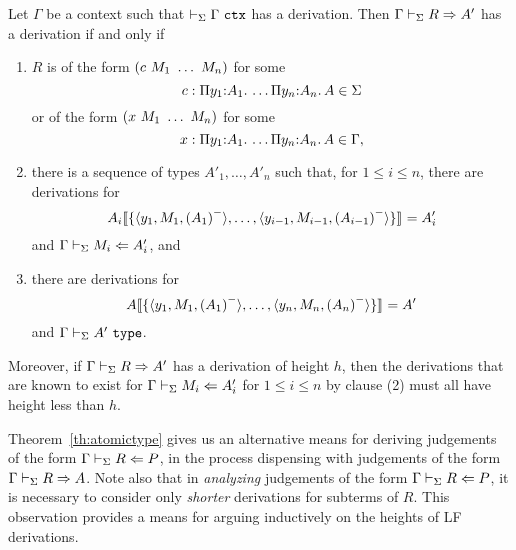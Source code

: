\begin{theorem}\label{th:atomictype}
Let $\Gamma$ be a context such that $\lfctx{\Gamma}$ has a derivation.
%
Then $\lfsynthtype{\Gamma}{R}{A'}$  has a derivation if and only if

\begin{enumerate}
\item $R$ is of the form $(c \app M_1 \app \ldots\app M_n)$ for some
    \[c:\typedpi{y_1}{A_1}{\ldots \typedpi{y_n}{A_n}{A}} \in \Sigma\] or
    of the form $(x \app M_1 \app \ldots\app M_n)$ for some
    \[x:\typedpi{y_1}{A_1}{\ldots \typedpi{y_n}{A_n}{A}} \in \Gamma,\]
    
  \item there is a sequence of types $A'_1,\ldots,A'_n$ such that, for
    $1\leq i\leq n$, there are derivations for
    \[\hsub{\{\langle y_1, M_1,\erase{A_1}\rangle, \ldots,
             \langle y_{i-1}, M_{i-1}, \erase{A_{i-1}} \rangle\}}
          {A_i}
          {A'_i}\]
    and $\lfchecktype{\Gamma}{M_i}{A'_i}$, and
         
  \item there are derivations for
    \[\hsub{\{\langle y_1, M_1,\erase{A_1}\rangle, \ldots,
                 \langle y_n, M_n, \erase{A_n} \rangle\}}
              {A}
              {A'}\]
    and $\lftype{\Gamma}{A'}$.
  \end{enumerate}
  Moreover, if $\lfsynthtype{\Gamma}{R}{A'}$ has a derivation of
  height $h$, then the derivations that are known to exist for
  $\lfchecktype{\Gamma}{M_i}{A'_i}$  for $1 \leq i \leq n$ by clause
  (2) must all have height less than $h$.
  \end{theorem}

Theorem~\ref{th:atomictype} gives us an alternative means for deriving
judgements of the form $\lfchecktype{\Gamma}{R}{P}$, in the process
dispensing with judgements of the form $\lfsynthtype{\Gamma}{R}{A}$.
%
Note also that in \emph{analyzing} judgements of the form
$\lfchecktype{\Gamma}{R}{P}$, it is necessary to consider only
\emph{shorter} derivations for subterms of $R$.
%
This observation provides a means for arguing inductively on the
heights of LF derivations.  

